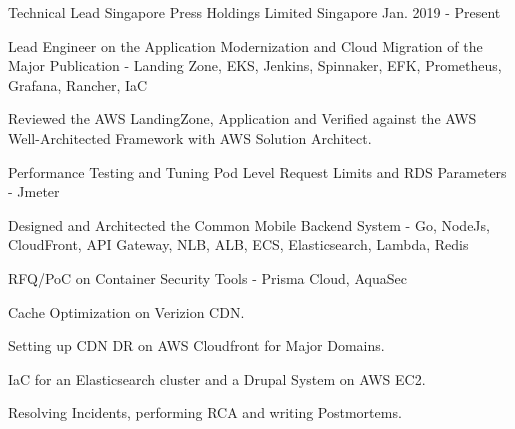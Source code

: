 

\begin{cventries}


  \cventry
      {Technical Lead} %
      {Singapore Press Holdings Limited} %
      {Singapore} %
      {Jan. 2019 - Present} %
      { %
        \begin{cvitems}
          \item {Lead Engineer on the Application Modernization and Cloud Migration of the Major Publication - Landing Zone, EKS, Jenkins, Spinnaker, EFK, Prometheus, Grafana, Rancher, IaC}
          \item {Reviewed the AWS LandingZone, Application and Verified against the AWS Well-Architected Framework with AWS Solution Architect.}\newline
          \item {Performance Testing and Tuning Pod Level Request Limits and RDS Parameters - Jmeter}
          \item {Designed and Architected the Common Mobile Backend System - Go, NodeJs, CloudFront, API Gateway, NLB, ALB, ECS, Elasticsearch, Lambda, Redis}
          \item {RFQ/PoC on Container Security Tools - Prisma Cloud, AquaSec}
          \item {Cache Optimization on Verizion CDN.}
          \item {Setting up CDN DR on AWS Cloudfront for Major Domains.}
          \item {IaC for an Elasticsearch cluster and a Drupal System on AWS EC2.}
          \item {Resolving Incidents, performing RCA and writing Postmortems.}
        \end{cvitems}
      }



\end{cventries}
